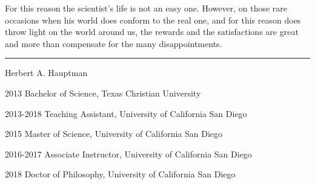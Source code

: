 \documentclass[12pt]{ucsd-thesis-2018}
\begin{document}
\begin{frontmatter}
\begin{epigraph}
  \noindent\begin{minipage}{.3\textwidth}
    \hfill
  \end{minipage}
  \begin{minipage}{.7\textwidth}
    \begin{flushleft}
      For this reason the scientist's life is not an easy one.  However, on those rare occasions when his world does conform to the real one, and for this reason does throw light on the world around us, the rewards and the satisfactions are great and more than compensate for the many disappointments.
    \end{flushleft}
    \begin{flushright}
      \rule[.5ex]{1cm}{.1pt} Herbert A. Hauptman
    \end{flushright}
  \end{minipage}
\end{epigraph}

\tableofcontents

\listoffigures


\begin{acknowledgements}

\end{acknowledgements}

\begin{vitapage}
\begin{vita}
\item[2013] Bachelor of Science, Texas Christian University
\item[2013-2018] Teaching Assistant, University of California San Diego
\item[2015] Master of Science, University of California San Diego
\item[2016-2017] Associate Instructor, University of California San Diego
\item[2018] Doctor of Philosophy, University of California San Diego
\end{vita}


\end{vitapage}
\end{frontmatter}
\end{document}
